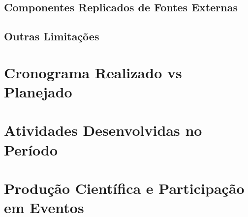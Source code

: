 \documentclass[12pt,a4paper]{article}
\begin{document}
\subsection{Componentes Replicados de Fontes Externas}

\subsection{Outras Limitações}

\section{Cronograma Realizado vs Planejado}


\section{Atividades Desenvolvidas no Período}

\section{Produção Científica e Participação em Eventos}

\end{document}
